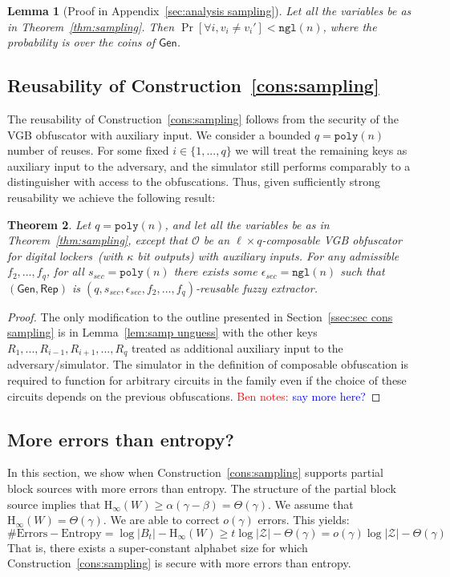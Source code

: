 \documentclass[11pt]{article}
\newcommand{\secref}[1]{\mbox{Section~\ref{#1}}}
\newcommand{\apref}[1]{\mbox{Appendix~\ref{#1}}}
\newcommand{\thref}[1]{\mbox{Theorem~\ref{#1}}}
\newcommand{\lemref}[1]{\mbox{Lemma~\ref{#1}}}
\newcommand{\consref}[1]{\mbox{Construction~\ref{#1}}}
\newcommand{\class}[1]{{\ensuremath{\mathsf{#1}}}}
\newcommand{\gen}{\ensuremath{\class{Gen}}\xspace}
\newcommand{\rep}{\ensuremath{\class{Rep}}\xspace}
\newcommand{\poly}{\ensuremath{\mathtt{poly}}\xspace}
\newcommand{\ngl}{\ensuremath{\mathtt{ngl}}\xspace}
\newcommand{\Hoo}{\mathrm{H}_\infty}
\newtheorem{theorem}{Theorem}[section]
\newtheorem{lemma}[theorem]{Lemma}
\newcommand{\authnote}[2]{{\textcolor{red}{\textsf{#1 notes: }\textcolor{blue}{ #2}}\marginpar{\textcolor{red}{\textbf{!!!!!}}}}}
\newcommand{\authnote}[2]{}
\newcommand{\bnote}[1]{{\authnote{Ben}{#1}}}
\begin{document}
\begin{lemma}[Proof in \apref{sec:analysis sampling}]
\label{lem:sampling errors}
Let all the variables be as in \thref{thm:sampling}.
 Then $\Pr[\forall i, v_i\neq v_i'] < \ngl(n)$, where the probability is over the coins of $\gen$.
\end{lemma}

\subsection{Reusability of \consref{cons:sampling}}
The reusability of \consref{cons:sampling} follows from the security of the VGB obfuscator with auxiliary input.  We consider a bounded $q = \poly(n)$ number of reuses.  For some fixed $i\in \{1,..., q\}$ we will treat the remaining keys as auxiliary input to the adversary, and the simulator still performs comparably to a distinguisher with access to the obfuscations.  Thus, given sufficiently strong reusability we achieve the following result:

\begin{theorem}
\label{thm:reusability}
Let $q = \poly(n)$, and let all the variables be as in \thref{thm:sampling}, except that $\mathcal{O}$ be an $\ell\times q$-composable VGB obfuscator for digital lockers~(with $\kappa$ bit outputs) with auxiliary inputs.  For any admissible $f_2,..., f_q$, for all $s_{sec} = \poly(n)$ there exists some $\epsilon_{sec} = \ngl(n)$ such that $(\gen, \rep)$ is $(q, s_{sec}, \epsilon_{sec}, f_2,..., f_q)$-reusable fuzzy extractor.
\end{theorem}
\begin{proof}
The only modification to the outline presented in \secref{ssec:sec cons sampling} is in \lemref{lem:samp unguess} with the other keys $R_1,..., R_{i-1}, R_{i+1}, ..., R_q$ treated as additional auxiliary input to the adversary/simulator.  The simulator in the definition of composable obfuscation is required to function for arbitrary circuits in the family even if the choice of these circuits depends on the previous obfuscations.
\bnote{say more here?}
\end{proof}

\subsection{More errors than entropy?}
In this section, we show when \consref{cons:sampling} supports partial block sources with more errors than entropy.  The structure of the partial block source implies that $\Hoo(W) \ge \alpha (\gamma-\beta ) = \Theta(\gamma)$.  We assume that $\Hoo(W) = \Theta(\gamma)$.  We are able to correct $o(\gamma)$ errors.
This yields:
\[
\text{\# Errors} - \text{Entropy} =  \log |B_t| -\Hoo(W) \ge t \log |\mathcal{Z}| - \Theta(\gamma)= o(\gamma) \log |\mathcal{Z}| - \Theta(\gamma)
\]
That is, there exists a super-constant alphabet size for which \consref{cons:sampling} is secure with more errors than entropy.  
\end{document}
